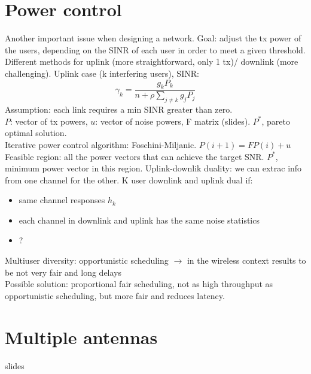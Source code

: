 \section{Power control}
Another important issue when designing a network. Goal: adjust the tx power of the users, depending on the SINR of each user in order to meet a given threshold. Different methods for uplink (more straightforward, only 1 tx)/ downlink (more challenging).
Uplink case (k interfering users), SINR: $$\gamma_k = \frac{g_kP_k}{n + \rho \sum_{j \neq k} g_jP_j}$$
Assumption: each link requires a min SINR greater than zero. \\
$P$: vector of tx powers, $u$: vector of noise powers, F matrix (slides). $P^*$, pareto optimal solution. \\
Iterative power control algorithm: Foschini-Miljanic. $P(i+1) = FP(i) + u$ \\
Feasible region: all the power vectors that can achieve the target SNR. $P^*$, minimum power vector in this region.
Uplink-downlik duality: we can extrac info from one channel for the other. K user downlink and uplink dual if:
\begin{itemize}
  \item same channel responses $h_k$
  \item each channel in downlink and uplink has the same noise statistics
  \item ?
\end{itemize}
Multiuser diversity: opportunistic scheduling $\rightarrow$ in the wireless context results to be not very fair and long delays\\
Possible solution: proportional fair scheduling, not as high throughput as opportunistic scheduling, but more fair and reduces latency.
\section{Multiple antennas}
slides

